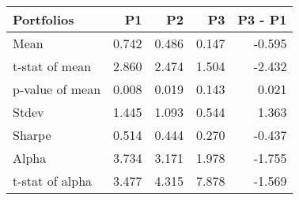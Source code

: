 \begin{tabular}{lrrrr}
\toprule
Portfolios & P1 & P2 & P3 & P3 - P1 \\
\midrule
Mean & 0.742 & 0.486 & 0.147 & -0.595 \\
t-stat of mean & 2.860 & 2.474 & 1.504 & -2.432 \\
p-value of mean & 0.008 & 0.019 & 0.143 & 0.021 \\
Stdev & 1.445 & 1.093 & 0.544 & 1.363 \\
Sharpe & 0.514 & 0.444 & 0.270 & -0.437 \\
Alpha & 3.734 & 3.171 & 1.978 & -1.755 \\
t-stat of alpha & 3.477 & 4.315 & 7.878 & -1.569 \\
\bottomrule
\end{tabular}
